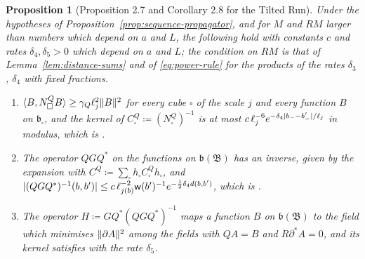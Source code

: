 \documentclass[11pt]{preprint}
\DeclarePairedDelimiter{\abs}{\lvert}{\rvert}
\DeclarePairedDelimiter{\norm}{\lVert}{\rVert}
\numberwithin{equation}{section}
\newtheorem{proposition}[theorem]{Proposition}
\theoremstyle{definition}
\theoremstyle{remark}
\theoremstyle{plain}
\begin{document}
\begin{proposition}[Proposition 2.7 and Corollary 2.8 for the Tilted Run]\label{prop:sequence-qgq}
Under the hypotheses of Proposition~\ref{prop:sequence-propagator}, and for $M$ and $RM$ larger than numbers which depend on $a$ and $L$, the following hold with constants $c$ and rates $\delta_4, \delta_5 > 0$ which depend on $a$ and $L$; the condition on $RM$ is that of Lemma~\ref{lem:distance-sums} and of \eqref{eq:power-rule} for the products of the rates $\delta_3$, $\delta_4$ with fixed fractions.
\begin{enumerate}[label=(\roman*)]
\item $\langle B, N^Q_\square B\rangle \geq \gamma_Q\ell_j^2\norm B^2$ for every cube $\square$ of the scale $j$ and every function $B$ on $\mathfrak b_\square$, and the kernel of $C^Q_\square \coloneqq (N^Q_\square)^{-1}$ is at most $c\,\ell_j^{-6}e^{-\delta_4\abs{b_- - b'_-}/\ell_j}$ in modulus, which is \cite[(2.147), (2.148)]{BalabanPRT2}.
\item The operator $QGQ^*$ on the functions on $\mathfrak b(\mathfrak B)$ has an inverse, given by the expansion \cite[(2.86)]{BalabanPRT2} with $C^Q \coloneqq \sum_\square h_\square C^Q_\square h_\square$, and $\abs{(QGQ^*)^{-1}(b, b')} \leq c\,\ell_{j(b)}^{-2}\mathsf w(b')^{-1}e^{-\frac12\delta_4d(b, b')}$, which is \cite[(2.149)]{BalabanPRT2}.
\item The operator $H \coloneqq GQ^*(QGQ^*)^{-1}$ maps a function $B$ on $\mathfrak b(\mathfrak B)$ to the field which minimises $\norm{\partial A}^2$ among the fields with $QA = B$ and $R\partial^*A = 0$, and its kernel satisfies \cite[(2.151)]{BalabanPRT2} with the rate $\delta_5$.
\end{enumerate}
\end{proposition}
\end{document}
